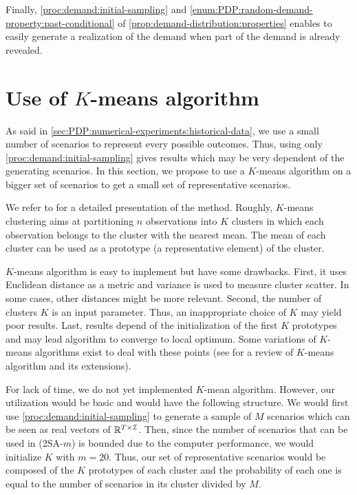 Finally, \cref{proc:demand:initial-sampling} and \cref{enum:PDP:random-demand-property:past-conditional} of \cref{prop:demand-distribution:properties} enables to easily generate a realization of the demand when part of the demand is already revealed.



\section{Use of $K$-means algorithm}
\label{sec:PDP:numerical-experiments:k-means}


As said in \cref{sec:PDP:numerical-experiments:historical-data}, we use a small number of scenarios to represent every possible outcomes.
Thus, using only \cref{proc:demand:initial-sampling} gives results which may be very dependent of the generating scenarios.
In this section, we propose to use a $K$-means algorithm on a bigger set of scenarios to get a small set of representative scenarios.


We refer to \citet[Chapter 14]{Hastie2009} for a detailed presentation of the method.
Roughly, $K$-means clustering aims at partitioning $n$ observations into $K$ clusters in which each observation belongs to the cluster with the nearest mean.
The mean of each cluster can be used as a prototype (\ie a representative element) of the cluster.


$K$-means algorithm is easy to implement but have some drawbacks.
First, it uses Euclidean distance as a metric and variance is used to measure cluster scatter.
In some cases, other distances might be more relevant.
Second, the number of clusters $K$ is an input parameter.
Thus, an inappropriate choice of $K$ may yield poor results.
Last, results depend of the initialization of the first $K$ prototypes and may lead algorithm to converge to local optimum.
Some variations of $K$-means algorithms exist to deal with these points (see \citet{Jain2010} for a review of $K$-means algorithm and its extensions).


\medskip


For lack of time, we do not yet implemented $K$-mean algorithm.
However, our utilization would be basic and would have the following structure.
We would first use \cref{proc:demand:initial-sampling} to generate a sample of $M$ scenarios which can be seen as real vectors of $\mathbb{R}^{T\times\mathcal{I}}$.
Then, since the number of scenarios that can be used in (2SA-$m$) is bounded due to the computer performance, we would initialize $K$ with $m=20$.
Thus, our set of representative scenarios would be composed of the $K$ prototypes of each cluster and the probability of each one is equal to the number of scenarios in its cluster divided by $M$.



